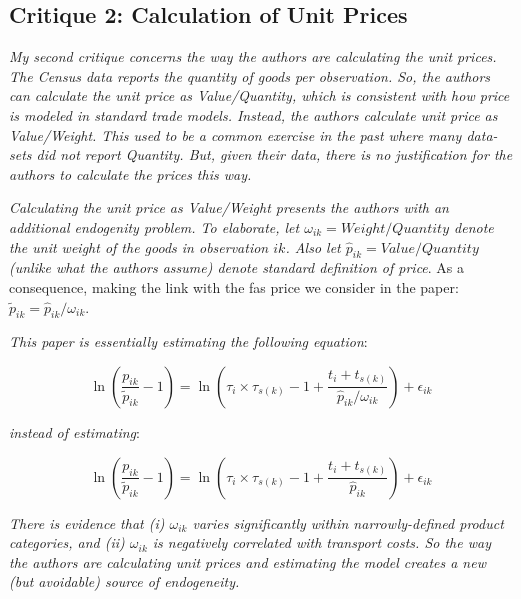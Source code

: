 \documentclass[a4paper,12pt]{article}
\begin{document}
\subsection{Critique 2: Calculation of Unit Prices}

\textit{My second critique concerns the way the authors are calculating the unit prices.
The Census data reports the quantity of goods per observation. So, the authors
can calculate the unit price as Value/Quantity, which is consistent with how
price is modeled in standard trade models. Instead, the authors calculate unit
price as Value/Weight. This used to be a common exercise in the past where
many data-sets did not report Quantity. But, given their data, there is no
justification for the authors to calculate the prices this way.}

\textit{Calculating the unit price as Value/Weight presents the authors
with an additional endogenity problem. To elaborate, let $\omega_{ik} = Weight/Quantity$
denote the unit weight of the goods in observation $ik$. Also let $\widehat{p}_{ik} = Value/Quantity$
(unlike what the authors assume) denote standard definition of price}. As a consequence, making the link with the fas price we consider in the paper: $\widetilde{p}_{ik} = \widehat{p}_{ik} / \omega_{ik}$.

\textit{This paper is essentially estimating the following equation}:

\begin{equation*}
\ln\left(\frac{p_{ik}}{\widetilde{p}_{ik}}-1 \right)= \ln \left(\tau_{i} \times \tau_{s(k)} -1 +\frac{t_{i} + t_{s(k)}}{\widehat{p}_{ik}/\omega_{ik}} \right) + \epsilon_{ik}
\end{equation*}

\textit{instead of estimating}:


\begin{equation*}
\ln\left(\frac{p_{ik}}{\widetilde{p}_{ik}}-1 \right)= \ln \left(\tau_{i} \times \tau_{s(k)}-1 +\frac{t_{i} + t_{s(k)}}{\widehat{p}_{ik}} \right) + \epsilon_{ik}
\end{equation*}

\textit{There is evidence that (i) $\omega_{ik}$ varies significantly within narrowly-defined product
categories, and (ii) $\omega_{ik}$ is negatively correlated with transport costs. So the
way the authors are calculating unit prices and estimating the model creates a
new (but avoidable) source of endogeneity.}
\end{document}
